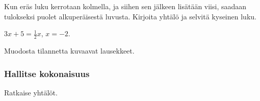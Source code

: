 \begin{tehtavasivu}
\begin{tehtava}
    Kun eräs luku kerrotaan kolmella, ja siihen sen jälkeen lisätään viisi, saadaan tulokseksi puolet alkuperäisestä luvusta. Kirjoita yhtälö ja selvitä kyseinen luku.
    \begin{vastaus}
        $3x+5=\frac12x$, $x=-2$.
    \end{vastaus}
\end{tehtava}

\begin{tehtava}
    Muodosta tilannetta kuvaavat lausekkeet.
    \begin{alakohdat}
    \end{alakohdat}
    \begin{vastaus}
        \begin{alakohdat}
        \end{alakohdat}
    \end{vastaus}
\end{tehtava}

\subsubsection*{Hallitse kokonaisuus}

\begin{tehtava}
    Ratkaise yhtälöt.
    \begin{alakohdat}
    \end{alakohdat}
    \begin{vastaus}
        \begin{alakohdat}
        \end{alakohdat}
    \end{vastaus}
\end{tehtava}


\end{tehtavasivu}
